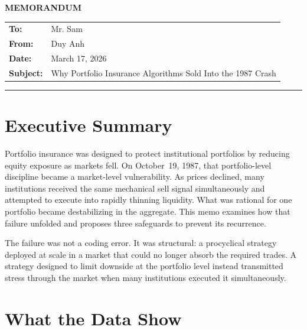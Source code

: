 \documentclass[12pt, a4paper]{article}
\begin{document}
\begin{center}
  {\Large\bfseries MEMORANDUM}
\end{center}

\vspace{0.5em}

\noindent
\begin{tabular}{@{}p{1.9cm}l}
  \textbf{To:}      & Mr. Sam \\[4pt]
  \textbf{From:}    & Duy Anh \\[4pt]
  \textbf{Date:}    & March 17, 2026 \\[4pt]
  \textbf{Subject:} & Why Portfolio Insurance Algorithms Sold Into the 1987 Crash \\
\end{tabular}

\vspace{0.8em}
\hrule
\vspace{1.4em}

\section{Executive Summary}

Portfolio insurance was designed to protect institutional portfolios by reducing equity
exposure as markets fell. On October~19, 1987, that portfolio-level discipline became a market-level vulnerability. As
prices declined, many institutions received the same mechanical sell signal simultaneously
and attempted to execute into rapidly thinning liquidity. What was rational for one
portfolio became destabilizing in the aggregate. This memo examines how that failure
unfolded and proposes three safeguards to prevent its recurrence.

The failure was not a coding error. It was structural: a procyclical strategy deployed
at scale in a market that could no longer absorb the required trades. A strategy designed
to limit downside at the portfolio level instead transmitted stress through the market
when many institutions executed it simultaneously.

\section{What the Data Show}
\end{document}
